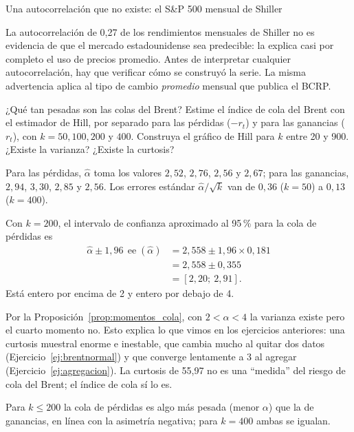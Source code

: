 \begin{ejresuelto}{Una autocorrelación que no existe: el S\&P 500 mensual de Shiller}
\begin{conclusion}
La autocorrelación de 0,27 de los rendimientos mensuales de Shiller no es evidencia de que el mercado
estadounidense sea predecible: la explica casi por completo el uso de precios promedio. Antes de
interpretar cualquier autocorrelación, hay que verificar cómo se construyó la serie. La misma advertencia
aplica al tipo de cambio \emph{promedio} mensual que publica el BCRP.
\end{conclusion}
\end{ejresuelto}

\begin{ejresuelto}{¿Qué tan pesadas son las colas del Brent?}\label{ej:hill}
\enunciado Estime el índice de cola del Brent con el estimador de Hill, por separado para las pérdidas
($-r_t$) y para las ganancias ($r_t$), con $k=50,100,200$ y $400$. Construya el gráfico de Hill para
$k$ entre 20 y 900. ¿Existe la varianza? ¿Existe la curtosis?

\solucion
{} Para las pérdidas, $\hat\alpha$ toma los valores $2{,}52$, $2{,}76$, $2{,}56$
y $2{,}67$; para las ganancias, $2{,}94$, $3{,}30$, $2{,}85$ y $2{,}56$. Los errores estándar
$\hat\alpha/\sqrt k$ van de $0{,}36$ ($k=50$) a $0{,}13$ ($k=400$).

 Con $k=200$, el intervalo de confianza aproximado al 95\,\% para la cola de
pérdidas es
\begin{align*}
  \hat\alpha\pm1{,}96\,\operatorname{ee}(\hat\alpha) &= 2{,}558\pm1{,}96\times0{,}181\\
                                                     &= 2{,}558\pm0{,}355\\
                                                     &= [2{,}20;\ 2{,}91].
\end{align*}
Está entero por encima de 2 y entero por debajo de 4.

 Por la Proposición~\ref{prop:momentos_cola}, con $2<\alpha<4$ la varianza
existe pero el cuarto momento no. Esto explica lo que vimos en los ejercicios anteriores: una curtosis
muestral enorme e inestable, que cambia mucho al quitar dos datos (Ejercicio~\ref{ej:brentnormal}) y que
converge lentamente a 3 al agregar (Ejercicio~\ref{ej:agregacion}). La curtosis de 55,97 no es una
``medida'' del riesgo de cola del Brent; el índice de cola sí lo es.

 Para $k\le200$ la cola de pérdidas es algo más pesada (menor
$\alpha$) que la de ganancias, en línea con la asimetría negativa; para $k=400$ ambas se igualan.


\end{ejresuelto}
